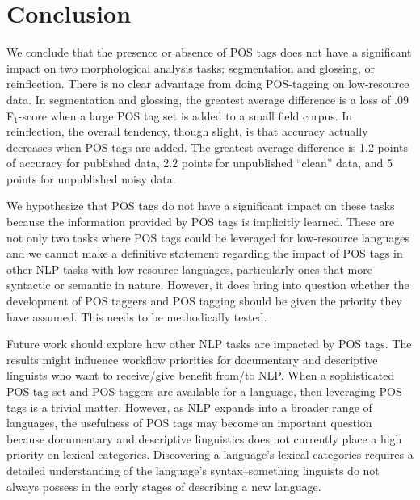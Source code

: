 \section{Conclusion}

We conclude that the presence or absence of POS tags does not have a significant impact on two morphological analysis tasks: segmentation and glossing, or reinflection. There is no clear advantage from doing POS-tagging on low-resource data. In segmentation and glossing, the greatest average difference is a loss of .09 F$_1$-score when a large POS tag set is added to a small field corpus. In reinflection, the overall tendency, though slight, is that accuracy actually decreases when POS tags are added. The greatest average difference is 1.2 points of accuracy for published data, 2.2 points for unpublished ``clean'' data, and 5 points for unpublished noisy data.

We hypothesize that POS tags do not have a significant impact on these tasks because the information provided by POS tags is implicitly learned. These are not only two tasks where POS tags could be leveraged for low-resource languages and we cannot make a definitive statement regarding the impact of POS tags in other NLP tasks with low-resource languages, particularly ones that more syntactic or semantic in nature. However, it does bring into question whether the development of POS taggers and POS tagging should be given the priority they have assumed. This needs to be methodically tested. 

Future work should explore how other NLP tasks are impacted by POS tags. The results might influence workflow priorities for documentary and descriptive linguists who want to receive/give benefit from/to NLP. When a sophisticated POS tag set and POS taggers are available for a language, then leveraging POS tags is a trivial matter. However, as NLP expands into a broader range of languages, the usefulness of POS tags may become an important question because documentary and descriptive linguistics does not currently place a high priority on lexical categories. Discovering a language's lexical categories requires a detailed understanding of the language's syntax--something linguists do not always possess in the early stages of describing a new language. 



